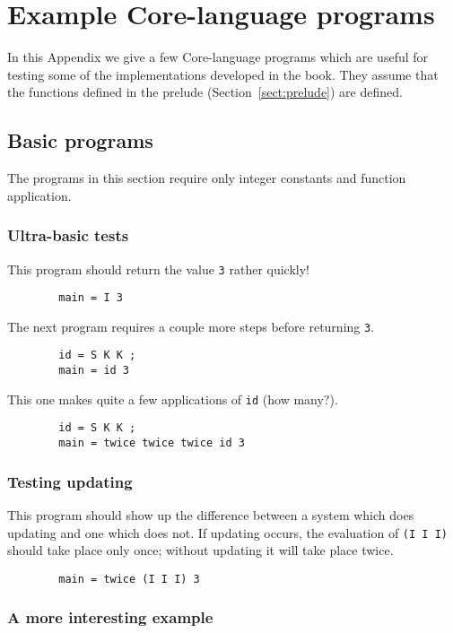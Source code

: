 \chapter{Example Core-language programs}
\label{sect:core-progs}

In this Appendix we give a few Core-language programs which are useful
for testing some of the implementations developed in the book.
They assume that the functions defined in the prelude
(Section~\ref{sect:prelude}) are defined.

\section{Basic programs}

The programs in this section require only integer constants and
function application.

\subsection{Ultra-basic tests}

This program should return the value \mbox{\tt 3} rather quickly!
\begin{verbatim}
        main = I 3
\end{verbatim}
The next program requires a couple more steps before returning \mbox{\tt 3}.
\begin{verbatim}
        id = S K K ;
        main = id 3
\end{verbatim}
This one makes quite a few applications of \mbox{\tt id} (how many?).
\begin{verbatim}
        id = S K K ;
        main = twice twice twice id 3
\end{verbatim}

\subsection{Testing updating}

This program should show up the difference between a system which does
updating and one which does not.
If updating occurs, the evaluation of \mbox{\tt (I\ I\ I)} should take place only once;
without updating it will take place twice.
\begin{verbatim}
        main = twice (I I I) 3
\end{verbatim}

\subsection{A more interesting example}

